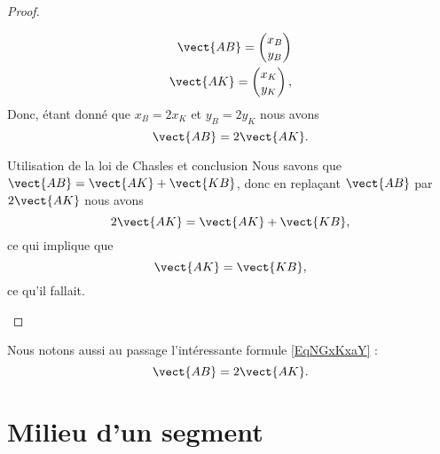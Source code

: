 \begin{proof}
\begin{subproof}
            \begin{subequations}
                \begin{align}
                    \vect{ AB }=\begin{pmatrix}
                        x_B    \\ 
                        y_B    
                    \end{pmatrix}\\
                    \vect{ AK }=\begin{pmatrix}
                        x_K    \\ 
                        y_K    
                    \end{pmatrix},
                \end{align}
            \end{subequations}
            Donc, étant donné que \( x_B=2x_K\) et \( y_B=2y_K\) nous avons
            \begin{equation}    \label{EqNGxKxaY}
                \vect{ AB }=2\vect{ AK }.
            \end{equation}
        \item[Utilisation de la loi de Chasles et conclusion]
            Nous savons que \( \vect{ AB }=\vect{ AK }+\vect{ KB }\), donc en replaçant \( \vect{ AB }\) par \( 2\vect{ AK }\) nous avons
            \begin{equation}
                2\vect{ AK }=\vect{ AK }+\vect{ KB },
            \end{equation}
            ce qui implique que
            \begin{equation}
                \vect{ AK }=\vect{ KB },
            \end{equation}
            ce qu'il fallait.
    \end{subproof}
\end{proof}
Nous notons aussi au passage l'intéressante formule \eqref{EqNGxKxaY} :
\begin{equation}
    \vect{ AB }=2\vect{ AK }.
\end{equation}


\section{Milieu d'un segment}


